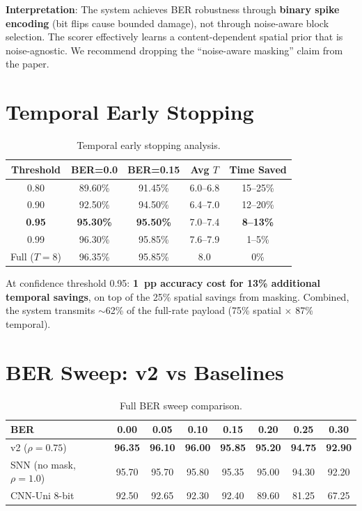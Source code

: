 \documentclass[conference]{IEEEtran}
\begin{document}
\textbf{Interpretation}: The system achieves BER robustness through \textbf{binary spike encoding} (bit flips cause bounded damage), not through noise-aware block selection. The scorer effectively learns a content-dependent spatial prior that is noise-agnostic. We recommend dropping the ``noise-aware masking'' claim from the paper.


\section{Temporal Early Stopping}

\begin{table}[h]
\centering
\caption{Temporal early stopping analysis.}
\begin{tabular}{@{}c c c c c@{}}
\toprule
\textbf{Threshold} & \textbf{BER=0.0} & \textbf{BER=0.15} & \textbf{Avg $T$} & \textbf{Time Saved} \\
\midrule
0.80 & 89.60\% & 91.45\% & 6.0--6.8 & 15--25\% \\
0.90 & 92.50\% & 94.50\% & 6.4--7.0 & 12--20\% \\
\textbf{0.95} & \textbf{95.30\%} & \textbf{95.50\%} & 7.0--7.4 & \textbf{8--13\%} \\
0.99 & 96.30\% & 95.85\% & 7.6--7.9 & 1--5\% \\
Full ($T{=}8$) & 96.35\% & 95.85\% & 8.0 & 0\% \\
\bottomrule
\end{tabular}
\end{table}

At confidence threshold 0.95: \textbf{1~pp accuracy cost for 13\% additional temporal savings}, on top of the 25\% spatial savings from masking. Combined, the system transmits $\sim$62\% of the full-rate payload (75\% spatial $\times$ 87\% temporal).


\section{BER Sweep: v2 vs Baselines}

\begin{table}[h]
\centering
\caption{Full BER sweep comparison.}
\begin{tabular}{@{}l c c c c c c c@{}}
\toprule
\textbf{BER} & 0.00 & 0.05 & 0.10 & 0.15 & 0.20 & 0.25 & 0.30 \\
\midrule
v2 ($\rho{=}0.75$) & \textbf{96.35} & \textbf{96.10} & \textbf{96.00} & \textbf{95.85} & \textbf{95.20} & \textbf{94.75} & \textbf{92.90} \\
SNN (no mask, $\rho{=}1.0$) & 95.70 & 95.70 & 95.80 & 95.35 & 95.00 & 94.30 & 92.20 \\
CNN-Uni 8-bit & 92.50 & 92.65 & 92.30 & 92.40 & 89.60 & 81.25 & 67.25 \\
\bottomrule
\end{tabular}
\end{table}
\end{document}
